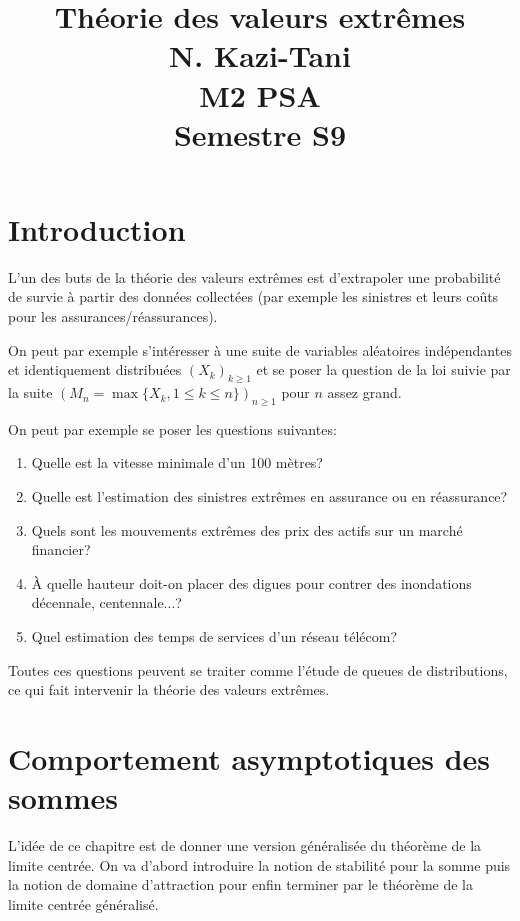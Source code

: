 \documentclass[10p,a4paper,reqno,titlepage]{report}
\title{Théorie des valeurs extrêmes \\N. Kazi-Tani \\
M2 PSA\\
Semestre S9}
\date{}
\begin{document}
\maketitle
\tableofcontents
\newpage

\chapter*{Introduction}
L'un des buts de la théorie des valeurs extrêmes est d'extrapoler une probabilité de survie à partir des données collectées (par exemple les sinistres et leurs coûts pour les assurances/réassurances).

On peut par exemple s'intéresser à une suite de variables aléatoires indépendantes et identiquement distribuées $(X_k)_{k\geq 1}$ et se poser la question de la loi suivie par la suite $(M_n = \max\{X_k, 1 \leq k \leq n\})_{n\geq 1}$ pour $n$ assez grand.

On peut par exemple se poser les questions suivantes:\
\begin{enumerate}
	\item Quelle est la vitesse minimale d'un 100 mètres?
	\item Quelle est l'estimation des sinistres extrêmes en assurance ou en réassurance?
	\item Quels sont les mouvements extrêmes des prix des actifs sur un marché financier?
	\item \`A quelle hauteur doit-on placer des digues pour contrer des inondations décennale, centennale...?
	\item Quel estimation des temps de services d'un réseau télécom?
\end{enumerate}
Toutes ces questions peuvent se traiter comme l'étude de queues de distributions, ce qui fait intervenir la théorie des valeurs extrêmes.

\begingroup
\let\clearpage\relax


\endgroup

\chapter{Comportement asymptotiques des sommes}
L'idée de ce chapitre est de donner une version généralisée du théorème de la limite centrée. On va d'abord introduire la notion de stabilité pour la somme puis la notion de domaine d'attraction pour enfin terminer par le théorème de la limite centrée généralisé.
\end{document}
